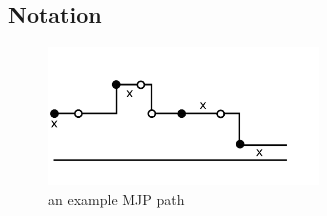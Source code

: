 \subsection{Notation}\label{sec:notation}

\begin{figure}[H]
  \centering
  \begin{minipage}[H]{0.65\linewidth}
  \centering
    \includegraphics [width=0.64\textwidth, angle=0]{figs/VX.pdf}

  \end{minipage}
\caption{an example MJP path}
     \label{fig:vx}
  \end{figure}
